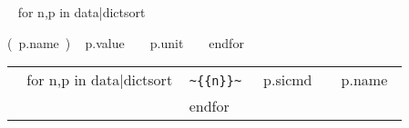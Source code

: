 \documentclass{article}
\begin{document}
\begin{description}
~{ for n,p in data|dictsort }~\item[\Q{~{{n}}~}] (~{{p.name}}~) ~{{ p.value }}~ ~{{ p.unit }}~
~{ endfor }~
\end{description}

\begin{tabular}[h]{r l r}
~{ for n,p in data|dictsort }~
\verb|~{{n}}~| & ~{{p.sicmd}}~ & ~{{p.name}}~ \\
~{ endfor }~
\end{tabular}
\end{document}
